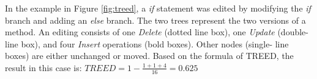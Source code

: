 In the example in Figure \ref{fig:treed}, a \textit{if} statement was edited by modifying the \textit{if} branch and adding an \textit{else} branch. The two trees represent the two versions of a method. An editing consists of one \textit{Delete} (dotted line box), one \textit{Update} (double-line box), and four \textit{Insert} operations (bold boxes). Other nodes (single- line boxes) are either unchanged or moved. Based on the formula of TREED, the result in this case is: $TREED = 1 - \frac{1 + 1 + 4}{16}=0.625$



